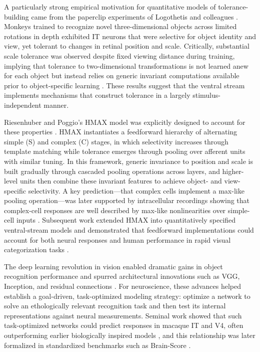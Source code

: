 \documentclass[pdflatex,sn-nature]{sn-jnl}
\begin{document}
A particularly strong empirical motivation for quantitative models of tolerance-building came from the paperclip experiments of Logothetis and colleagues \citep{Logothetis1995}. Monkeys trained to recognize novel three-dimensional objects across limited rotations in depth exhibited IT neurons that were selective for object identity and view, yet tolerant to changes in retinal position and scale. Critically, substantial scale tolerance was observed despite fixed viewing distance during training, implying that tolerance to two-dimensional transformations is not learned anew for each object but instead relies on generic invariant computations available prior to object-specific learning \citep{LogothetisSheinberg1996}. These results suggest that the ventral stream implements mechanisms that construct tolerance in a largely stimulus-independent manner.

Riesenhuber and Poggio’s HMAX model was explicitly designed to account for these properties \citep{RiesenhuberPoggio1999}. HMAX instantiates a feedforward hierarchy of alternating simple (S) and complex (C) stages, in which selectivity increases through template matching while tolerance emerges through pooling over afferent units with similar tuning. In this framework, generic invariance to position and scale is built gradually through cascaded pooling operations across layers, and higher-level units then combine these invariant features to achieve object- and view-specific selectivity. A key prediction—that complex cells implement a max-like pooling operation—was later supported by intracellular recordings showing that complex-cell responses are well described by max-like nonlinearities over simple-cell inputs \citep{Lampl2004}. Subsequent work extended HMAX into quantitatively specified ventral-stream models and demonstrated that feedforward implementations could account for both neural responses and human performance in rapid visual categorization tasks \citep{Serre2007pami,Serre2007pnas,Thorpe1996}.


The deep learning revolution in vision enabled dramatic gains in object recognition performance and spurred architectural innovations such as VGG, Inception, and residual connections \citep{Krizhevsky2012,Russakovsky2015,Simonyan2015,Szegedy2015,He2016}. For neuroscience, these advances helped establish a goal-driven, task-optimized modeling strategy: optimize a network to solve an ethologically relevant recognition task and then test its internal representations against neural measurements. Seminal work showed that such task-optimized networks could predict responses in macaque IT and V4, often outperforming earlier biologically inspired models \citep{Yamins2014,Cadieu2014}, and this relationship was later formalized in standardized benchmarks such as Brain-Score \citep{Schrimpf2020-az}.
\end{document}
